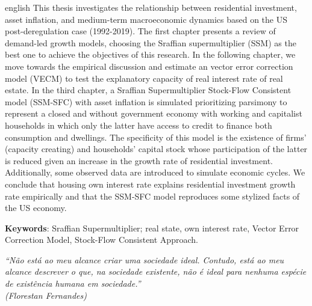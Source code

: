 \documentclass[
12pt,				%
openright,			%
oneside,			%
a4paper,		%
english,			%
brazil,				%
sumario=tradicional,
]{abntex2}
\begin{document}
\begin{resumo}
\begin{otherlanguage*}{english}
	This thesis investigates the relationship between residential investment, asset inflation, and medium-term macroeconomic dynamics based on the US post-deregulation case  (1992-2019). 
	The first chapter presents a review of demand-led growth models, choosing the Sraffian supermultiplier (SSM) as the best one to achieve the objectives of this research. 
	In the following chapter, we move towards the empirical discussion and estimate an vector error correction model (VECM) to test the explanatory capacity of real interest rate of real estate. 
	In the third chapter, a Sraffian Supermultiplier Stock-Flow Consistent model (SSM-SFC) with asset inflation is simulated prioritizing parsimony to represent a closed and without government economy with working and capitalist households in which only the latter have access to credit to finance both consumption and dwellings. 
	The specificity of this model is the existence of firms' (capacity creating) and households' capital stock  whose participation of the latter is reduced given an increase in the growth rate of residential investment. 
	Additionally, some observed data are introduced to simulate economic cycles. 
 	We conclude that housing own interest rate explains residential investment growth rate empirically and that the SSM-SFC model reproduces some stylized facts of the US economy.
	
	\vspace{\onelineskip}
	
	\noindent\textbf{Keywords}: Sraffian Supermultiplier; real state, own interest rate, Vector Error Correction Model, Stock-Flow Consistent Approach. 
	
\end{otherlanguage*}
\end{resumo}

\begin{epigrafe}
	\vspace*{\fill}
	\begin{flushright}
		\textit{``Não está ao meu alcance criar uma sociedade ideal. Contudo, está ao meu alcance descrever o que, na sociedade existente, não é ideal para nenhuma espécie de existência humana em sociedade.''\\
			(Florestan Fernandes)}
	\end{flushright}
\end{epigrafe}
\newpage
\end{document}
